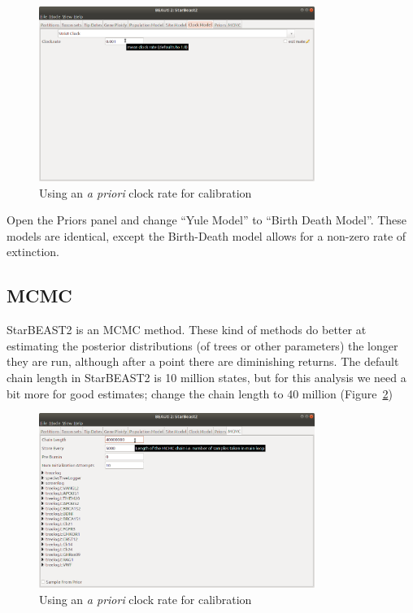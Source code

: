 \documentclass[12pt]{article}
\begin{document}
\begin{figure}[htb!]
\centering
\includegraphics[width=0.8\textwidth]{figures/strictClockModel.png}
\caption
{Using an \textit{a priori} clock rate for calibration}
\label{fig:strictClockModel}
\end{figure}

Open the Priors panel and change ``Yule Model'' to ``Birth Death Model''.
These models are identical, except the Birth-Death model allows for a
non-zero rate of extinction.

\subsection{MCMC}
\label{subsec:MCMC}

StarBEAST2 is an MCMC method. These kind of methods do better at estimating
the posterior distributions (of trees or other parameters) the longer they
are run, although after a point there are diminishing returns. The default
chain length in StarBEAST2 is 10 million states, but for this analysis we
need a bit more for good estimates; change the chain length to 40 million
(Figure~\ref{fig:chainLength})

\begin{figure}[htb!]
\centering
\includegraphics[width=0.8\textwidth]{figures/chainLength.png}
\caption
{Using an \textit{a priori} clock rate for calibration}
\label{fig:chainLength}
\end{figure}
\end{document}
